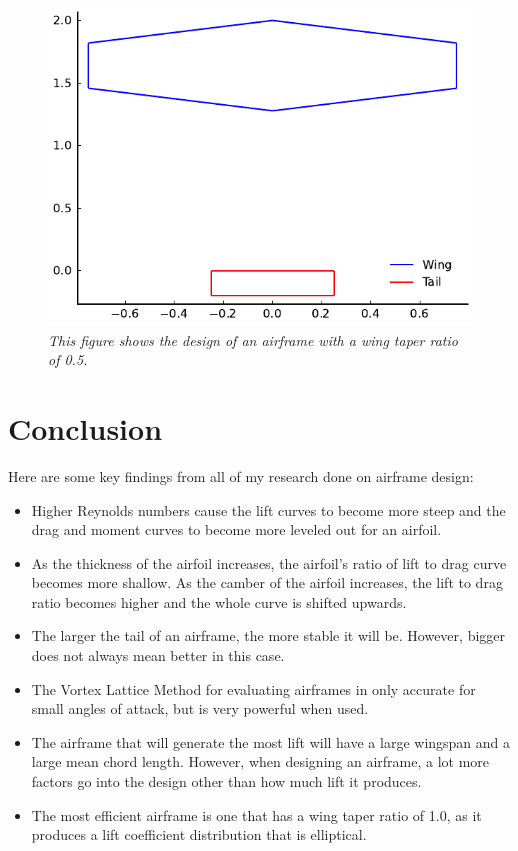 \documentclass{journal}
\begin{document}
	\begin{figure}[H]
		\includegraphics{../graphics/taper_design.pdf}
		\caption{\emph{This figure shows the design of an airframe with a wing taper ratio of 0.5.}}
		\label{fig:taper_design}
	\end{figure}
	
	\section{Conclusion}
	Here are some key findings from all of my research done on airframe design:
	\begin{itemize}
		\item Higher Reynolds numbers cause the lift curves to become more steep and the drag and moment curves to become more leveled out for an airfoil.
		\item As the thickness of the airfoil increases, the airfoil's ratio of lift to drag curve becomes more shallow. As the camber of the airfoil increases, the lift to drag ratio becomes higher and the whole curve is shifted upwards. 
		\item The larger the tail of an airframe, the more stable it will be. However, bigger does not always mean better in this case.
		\item The Vortex Lattice Method for evaluating airframes in only accurate for small angles of attack, but is very powerful when used.
		\item The airframe that will generate the most lift will have a large wingspan and a large mean chord length. However, when designing an airframe, a lot more factors go into the design other than how much lift it produces.
		\item The most efficient airframe is one that has a wing taper ratio of 1.0, as it produces a lift coefficient distribution that is elliptical.
	\end{itemize}
	
\end{document}
